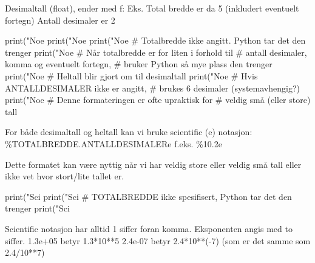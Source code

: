 {Desimaltall (float), ender med f:  %
Eks. %
  Total bredde er da 5 (inkludert eventuelt fortegn)
  Antall desimaler er 2

\begin{usncodebox}

print("Noe %
print("Noe %
print("Noe %
                                     # Totalbredde ikke angitt. Python tar det den trenger
print("Noe %
                                     # Når totalbredde er for liten i forhold til 
                                     # antall desimaler, komma og eventuelt fortegn, 
                                     # bruker Python så mye plass den trenger
print("Noe %
                                     # Heltall blir gjort om til desimaltall
print("Noe %
                                     # Hvis ANTALLDESIMALER ikke er angitt, 
                                     # brukes 6 desimaler (systemavhengig?) 
print("Noe %
                                     # Denne formateringen er ofte upraktisk for 
                                     # veldig små (eller store) tall
\end{usncodebox}

For både desimaltall og heltall kan vi bruke scientific (e) notasjon: 
\%TOTALBREDDE.ANTALLDESIMALERe   f.eks. \%10.2e
 
Dette formatet kan være nyttig når vi har veldig store eller veldig små tall eller ikke vet hvor stort/lite tallet er. 

\begin{usncodebox}
print("Sci %
print("Sci %
                                         # TOTALBREDDE ikke spesifisert, Python tar det den trenger
print("Sci %
\end{usncodebox}

Scientific notasjon har alltid 1 siffer foran komma. Eksponenten angis med to siffer.
1.3e+05 betyr 1.3*10**5
2.4e-07 betyr 2.4*10**(-7)   (som er det samme som 2.4/10**7)

}

